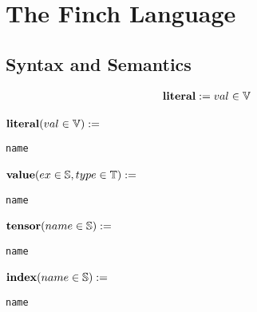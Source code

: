 
\section{The Finch Language}

\subsection{Syntax and Semantics}

\begin{align*}
    \text{\textbf{literal}} := val \in \mathbb{V}
\end{align*}

\noindent\begin{minipage}{.5\linewidth}
\raggedleft $\text{\textbf{literal}}(val \in \mathbb{V}) :=$~
\end{minipage}%
\begin{minipage}{.5\linewidth}
\begin{verbatim}
name
\end{verbatim}
\end{minipage}

\noindent\begin{minipage}{.5\linewidth}
\raggedleft $\text{\textbf{value}}(ex \in \mathbb{S}, type \in \mathbb{T}) :=$~
\end{minipage}%
\begin{minipage}{.5\linewidth}
\begin{verbatim}
name
\end{verbatim}
\end{minipage}
    
\noindent\begin{minipage}{.5\linewidth}
\raggedleft $\text{\textbf{tensor}}(name \in \mathbb{S}) :=$~
\end{minipage}%
\begin{minipage}{.5\linewidth}
\begin{verbatim}
name
\end{verbatim}
\end{minipage}

\noindent\begin{minipage}{.5\linewidth}
\raggedleft $\text{\textbf{index}}(name \in \mathbb{S}) :=$~
\end{minipage}%
\begin{minipage}{.5\linewidth}
\begin{verbatim}
name
\end{verbatim}
\end{minipage}

